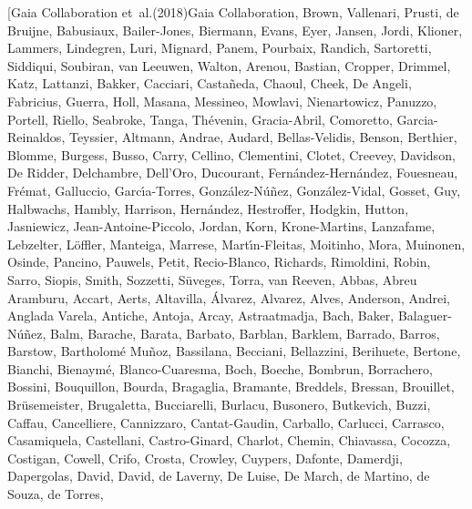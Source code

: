 \documentclass[longauth]{aa} %
\begin{document}
\begin{thebibliography}{112}
	\bibitem[{{Gaia Collaboration} {et~al.}(2018{}){Gaia
			Collaboration}, {Brown}, {Vallenari}, {Prusti}, {de Bruijne}, {Babusiaux},
		{Bailer-Jones}, {Biermann}, {Evans}, {Eyer}, {Jansen}, {Jordi}, {Klioner},
		{Lammers}, {Lindegren}, {Luri}, {Mignard}, {Panem}, {Pourbaix}, {Randich},
		{Sartoretti}, {Siddiqui}, {Soubiran}, {van Leeuwen}, {Walton}, {Arenou},
		{Bastian}, {Cropper}, {Drimmel}, {Katz}, {Lattanzi}, {Bakker}, {Cacciari},
		{Casta{\~n}eda}, {Chaoul}, {Cheek}, {De Angeli}, {Fabricius}, {Guerra},
		{Holl}, {Masana}, {Messineo}, {Mowlavi}, {Nienartowicz}, {Panuzzo},
		{Portell}, {Riello}, {Seabroke}, {Tanga}, {Th{\'e}venin}, {Gracia-Abril},
		{Comoretto}, {Garcia-Reinaldos}, {Teyssier}, {Altmann}, {Andrae}, {Audard},
		{Bellas-Velidis}, {Benson}, {Berthier}, {Blomme}, {Burgess}, {Busso},
		{Carry}, {Cellino}, {Clementini}, {Clotet}, {Creevey}, {Davidson}, {De
			Ridder}, {Delchambre}, {Dell'Oro}, {Ducourant},
		{Fern{\'a}ndez-Hern{\'a}ndez}, {Fouesneau}, {Fr{\'e}mat}, {Galluccio},
		{Garc{\'\i}a-Torres}, {Gonz{\'a}lez-N{\'u}{\~n}ez}, {Gonz{\'a}lez-Vidal},
		{Gosset}, {Guy}, {Halbwachs}, {Hambly}, {Harrison}, {Hern{\'a}ndez},
		{Hestroffer}, {Hodgkin}, {Hutton}, {Jasniewicz}, {Jean-Antoine-Piccolo},
		{Jordan}, {Korn}, {Krone-Martins}, {Lanzafame}, {Lebzelter}, {L{\"o}ffler},
		{Manteiga}, {Marrese}, {Mart{\'\i}n-Fleitas}, {Moitinho}, {Mora}, {Muinonen},
		{Osinde}, {Pancino}, {Pauwels}, {Petit}, {Recio-Blanco}, {Richards},
		{Rimoldini}, {Robin}, {Sarro}, {Siopis}, {Smith}, {Sozzetti}, {S{\"u}veges},
		{Torra}, {van Reeven}, {Abbas}, {Abreu Aramburu}, {Accart}, {Aerts},
		{Altavilla}, {{\'A}lvarez}, {Alvarez}, {Alves}, {Anderson}, {Andrei},
		{Anglada Varela}, {Antiche}, {Antoja}, {Arcay}, {Astraatmadja}, {Bach},
		{Baker}, {Balaguer-N{\'u}{\~n}ez}, {Balm}, {Barache}, {Barata}, {Barbato},
		{Barblan}, {Barklem}, {Barrado}, {Barros}, {Barstow}, {Bartholom{\'e}
			Mu{\~n}oz}, {Bassilana}, {Becciani}, {Bellazzini}, {Berihuete}, {Bertone},
		{Bianchi}, {Bienaym{\'e}}, {Blanco-Cuaresma}, {Boch}, {Boeche}, {Bombrun},
		{Borrachero}, {Bossini}, {Bouquillon}, {Bourda}, {Bragaglia}, {Bramante},
		{Breddels}, {Bressan}, {Brouillet}, {Br{\"u}semeister}, {Brugaletta},
		{Bucciarelli}, {Burlacu}, {Busonero}, {Butkevich}, {Buzzi}, {Caffau},
		{Cancelliere}, {Cannizzaro}, {Cantat-Gaudin}, {Carballo}, {Carlucci},
		{Carrasco}, {Casamiquela}, {Castellani}, {Castro-Ginard}, {Charlot},
		{Chemin}, {Chiavassa}, {Cocozza}, {Costigan}, {Cowell}, {Crifo}, {Crosta},
		{Crowley}, {Cuypers}, {Dafonte}, {Damerdji}, {Dapergolas}, {David}, {David},
		{de Laverny}, {De Luise}, {De March}, {de Martino}, {de Souza}, {de Torres},
}
\end{thebibliography}
\end{document}
